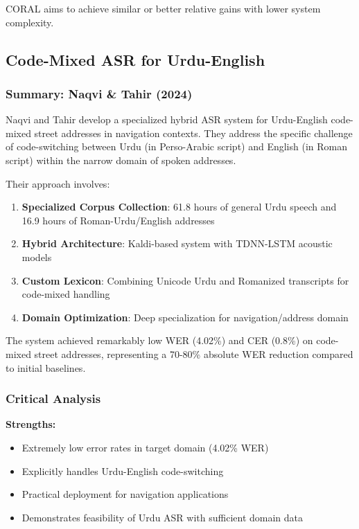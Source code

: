 CORAL aims to achieve similar or better relative gains with lower system complexity.

\subsection{Code-Mixed ASR for Urdu-English}

\subsubsection{Summary: Naqvi \& Tahir (2024)}

Naqvi and Tahir \cite{naqvi2024} develop a specialized hybrid ASR system for Urdu-English code-mixed street addresses in navigation contexts. They address the specific challenge of code-switching between Urdu (in Perso-Arabic script) and English (in Roman script) within the narrow domain of spoken addresses.

Their approach involves:

\begin{enumerate}
    \item \textbf{Specialized Corpus Collection}: 61.8 hours of general Urdu speech and 16.9 hours of Roman-Urdu/English addresses
    \item \textbf{Hybrid Architecture}: Kaldi-based system with TDNN-LSTM acoustic models
    \item \textbf{Custom Lexicon}: Combining Unicode Urdu and Romanized transcripts for code-mixed handling
    \item \textbf{Domain Optimization}: Deep specialization for navigation/address domain
\end{enumerate}

The system achieved remarkably low WER (4.02\%) and CER (0.8\%) on code-mixed street addresses, representing a 70-80\% absolute WER reduction compared to initial baselines.

\subsubsection{Critical Analysis}

\textbf{Strengths:}
\begin{itemize}
    \item Extremely low error rates in target domain (4.02\% WER)
    \item Explicitly handles Urdu-English code-switching
    \item Practical deployment for navigation applications
    \item Demonstrates feasibility of Urdu ASR with sufficient domain data
\end{itemize}

